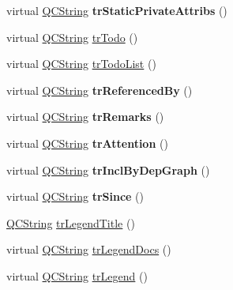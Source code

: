 \begin{DoxyCompactItemize}
\mbox{\label{class_translator_spanish_a9f8d37ee4ab9476b98c3f37f9bb74a68}} 
virtual \mbox{\hyperlink{class_q_c_string}{Q\+C\+String}} {\bfseries tr\+Static\+Private\+Attribs} ()
\item 
virtual \mbox{\hyperlink{class_q_c_string}{Q\+C\+String}} \mbox{\hyperlink{class_translator_spanish_af4efe183b5c04557a1ca1dd6e38ad6af}{tr\+Todo}} ()
\item 
virtual \mbox{\hyperlink{class_q_c_string}{Q\+C\+String}} \mbox{\hyperlink{class_translator_spanish_a6228a3cd135be2558bd639e356bfb745}{tr\+Todo\+List}} ()
\item 
\mbox{\label{class_translator_spanish_ae5f87400149e3a1cd0019c9869846235}} 
virtual \mbox{\hyperlink{class_q_c_string}{Q\+C\+String}} {\bfseries tr\+Referenced\+By} ()
\item 
\mbox{\label{class_translator_spanish_a28ebddc524ebc19b9902f9218c53f562}} 
virtual \mbox{\hyperlink{class_q_c_string}{Q\+C\+String}} {\bfseries tr\+Remarks} ()
\item 
\mbox{\label{class_translator_spanish_afb701ffea0df179e14acdf2d957e5b68}} 
virtual \mbox{\hyperlink{class_q_c_string}{Q\+C\+String}} {\bfseries tr\+Attention} ()
\item 
\mbox{\label{class_translator_spanish_a43d0761a299b6f2816c41715020e64a9}} 
virtual \mbox{\hyperlink{class_q_c_string}{Q\+C\+String}} {\bfseries tr\+Incl\+By\+Dep\+Graph} ()
\item 
\mbox{\label{class_translator_spanish_ae520843848c76c9e0df1a49ba878b1f0}} 
virtual \mbox{\hyperlink{class_q_c_string}{Q\+C\+String}} {\bfseries tr\+Since} ()
\item 
\mbox{\hyperlink{class_q_c_string}{Q\+C\+String}} \mbox{\hyperlink{class_translator_spanish_ae36cf2fbe0f335d87fa57d37d8a45e67}{tr\+Legend\+Title}} ()
\item 
virtual \mbox{\hyperlink{class_q_c_string}{Q\+C\+String}} \mbox{\hyperlink{class_translator_spanish_a4290436e8ccc955b47ade0df3dc79c77}{tr\+Legend\+Docs}} ()
\item 
virtual \mbox{\hyperlink{class_q_c_string}{Q\+C\+String}} \mbox{\hyperlink{class_translator_spanish_a99875d1ae2378f0d0d011bf4fcea85bf}{tr\+Legend}} ()

\end{DoxyCompactItemize}
